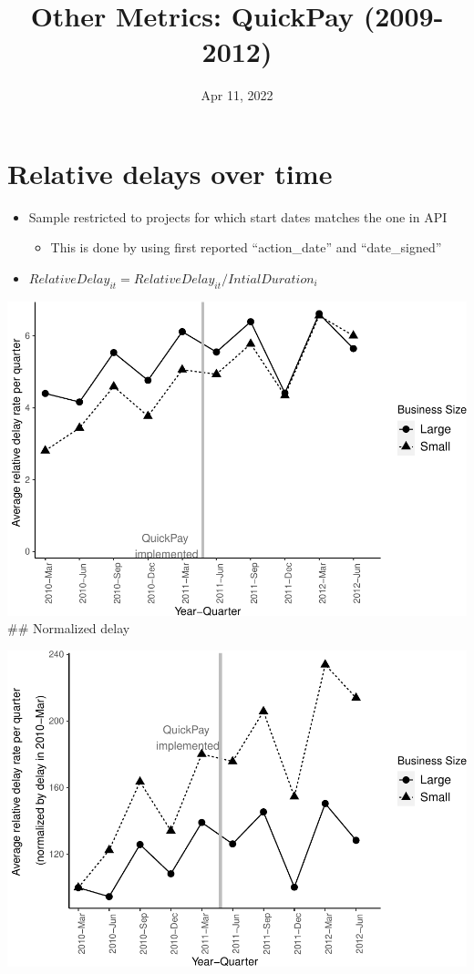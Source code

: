 \documentclass[
]{article}
\title{Other Metrics: QuickPay (2009-2012)}
\author{}
\date{\vspace{-2.5em}Apr 11, 2022}
\providecommand{\tightlist}{%
  \setlength{\itemsep}{0pt}\setlength{\parskip}{0pt}}
\begin{document}
\maketitle

\hypertarget{relative-delays-over-time}{%
\section{Relative delays over time}\label{relative-delays-over-time}}

\begin{itemize}
\tightlist
\item
  Sample restricted to projects for which start dates matches the one in
  API

  \begin{itemize}
  \tightlist
  \item
    This is done by using first reported ``action\_date'' and
    ``date\_signed''
  \end{itemize}
\item
  \(RelativeDelay_{it} = RelativeDelay_{it}/IntialDuration_i\)
\end{itemize}

\includegraphics{qp_first_relative_delay_files/figure-latex/plot_relative_delay-1.pdf}
\#\# Normalized delay

\includegraphics{qp_first_relative_delay_files/figure-latex/normalized_plot-1.pdf}
\end{document}
